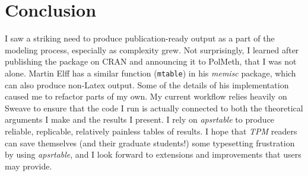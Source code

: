 \documentclass[10pt]{article} %
\begin{document}
\section{Conclusion}
\label{sec:extending-apsrtable}
I saw a striking need to produce publication-ready output as a part of the modeling process, especially as complexity grew. Not surprisingly, I learned after publishing the package on CRAN and announcing it to PolMeth, that I was not alone. Martin Elff has a similar function (\verb|mtable|) in his \textit{memisc} package, which can also produce non-Latex output. Some of the details of his implementation caused me to refactor parts of my own. My current workflow relies heavily on Sweave to  ensure that the code I run is actually connected to both the theoretical arguments I make and the results I present. I rely on \textit{apsrtable} to produce reliable, replicable, relatively painless tables of results. I hope that \textit{TPM} readers can save themselves (and their graduate students!) some typesetting frustration by using \textit{apsrtable}, and I look forward to extensions and improvements that users may provide.
\end{document}
